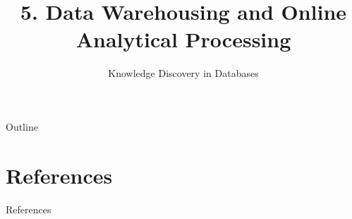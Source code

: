 \documentclass[aspectratio=169,t]{beamer}
\title[KDD~5.~OLAP]{5. Data Warehousing and Online Analytical Processing} %
\subtitle{Knowledge Discovery in Databases}
\begin{document}
  \maketitle

  { %
    \begin{frame}[noframenumbering]{Outline}
      \tableofcontents

    \end{frame}
  }

  
  
  
  
  
  
  

  \section*{References}
  \begin{frame}{References}
      \nocite{agarwal1996,agrawald1997,agrawalr1997,chaudhuri1997,codd1993,gray1997,han1998,harinarayan1996,hellerstein1997,imhoff2003,inmon2005,kimball2013,kimball2004,oneil1995,oneil1997,microsoftoledb,gupta1999}
      \printbibliography
  \end{frame}
\end{document}
